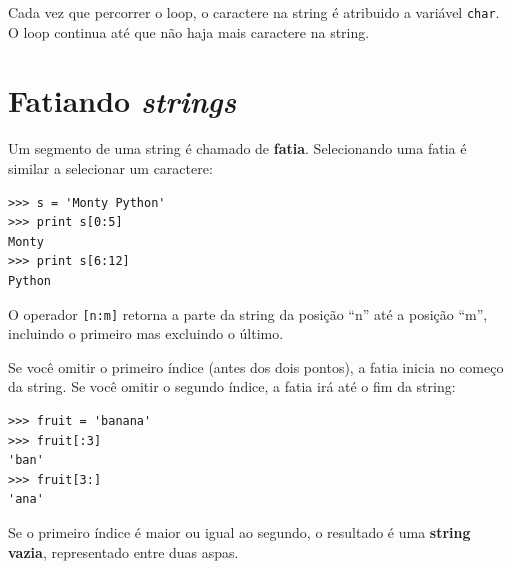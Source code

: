 {Cada vez que percorrer o loop, o caractere na string é atribuido a variável
{\tt char}. O loop continua até que não haja mais caractere na string.


\section{Fatiando {\it strings}}
\label{fatia}



Um segmento de uma string é chamado de {\bf fatia}. Selecionando uma fatia
é similar a selecionar um caractere:

\beforeverb
\begin{verbatim}
>>> s = 'Monty Python'
>>> print s[0:5]
Monty
>>> print s[6:12]
Python
\end{verbatim}
\afterverb
%
%
O operador {\tt[n:m]} retorna a parte da string da posição ``n'' até a
posição ``m'', incluindo o primeiro mas excluindo o último.


Se você omitir o primeiro índice (antes dos dois pontos), a fatia inicia no
começo da string. Se você omitir o segundo índice, a fatia irá até o fim da
string:

\beforeverb
\begin{verbatim}
>>> fruit = 'banana'
>>> fruit[:3]
'ban'
>>> fruit[3:]
'ana'
\end{verbatim}
\afterverb
%

Se o primeiro índice é maior ou igual ao segundo, o resultado é uma
{\bf string vazia}, representado entre duas aspas.

}
